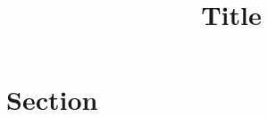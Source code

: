\documentclass{article}
\author{}
\date{}
\title{Title}
\begin{document}
\maketitle
\thispagestyle{fancy}
\section{Section}
\lipsum
\end{document}
